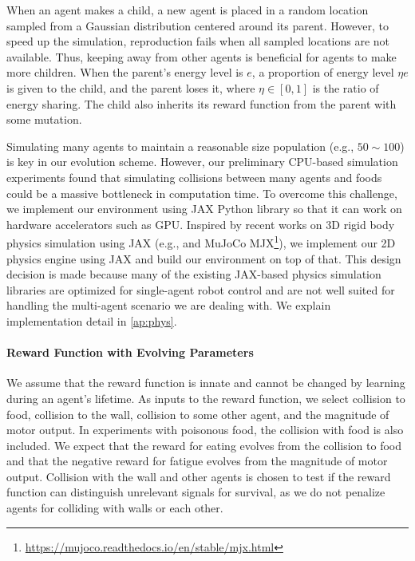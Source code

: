 When an agent makes a child, a new agent is placed in a random location sampled from a Gaussian distribution centered around its parent. However, to speed up the simulation, reproduction fails when all sampled locations are not available. Thus, keeping away from other agents is beneficial for agents to make more children. When the parent's energy level is $e$, a proportion of energy level $\eta e$ is given to the child, and the parent loses it, where $\eta \in [0, 1]$ is the ratio of energy sharing. The child also inherits its reward function from the parent with some mutation.

Simulating many agents to maintain a reasonable size population (e.g., $50\sim 100$) is key in our evolution scheme. However, our preliminary CPU-based simulation experiments found that simulating collisions between many agents and foods could be a massive bottleneck in computation time. To overcome this challenge, we implement our environment using JAX Python library \citep{jax2018github} so that it can work on hardware accelerators such as GPU. Inspired by recent works on 3D rigid body physics simulation using JAX (e.g., \citet{brax2021github} and MuJoCo \citep{todorov2012mujoco} MJX\footnote{\url{https://mujoco.readthedocs.io/en/stable/mjx.html}}), we implement our 2D physics engine using JAX and build our environment on top of that. This design decision is made because many of the existing JAX-based physics simulation libraries are optimized for single-agent robot control and are not well suited for handling the multi-agent scenario we are dealing with. We explain implementation detail in \cref{ap:phys}.


\paragraph{Reward Function with Evolving Parameters}
We assume that the reward function is innate and cannot be changed by learning during an agent's lifetime. As inputs to the reward function, we select  collision to food,  collision to the wall,  collision to some other agent, and  the magnitude of motor output. In experiments with poisonous food, the collision with food is also included. We expect that the reward for eating evolves from the collision to food and that the negative reward for fatigue evolves from the magnitude of motor output. Collision with the wall and other agents is chosen to test if the reward function can distinguish unrelevant signals for survival, as we do not penalize agents for colliding with walls or each other.

